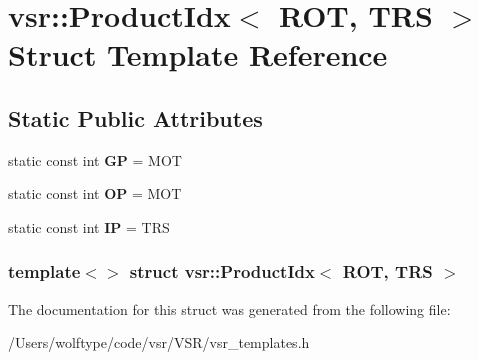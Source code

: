 \hypertarget{structvsr_1_1_product_idx_3_01_r_o_t_00_01_t_r_s_01_4}{\section{vsr\-:\-:Product\-Idx$<$ R\-O\-T, T\-R\-S $>$ Struct Template Reference}
\label{structvsr_1_1_product_idx_3_01_r_o_t_00_01_t_r_s_01_4}
}
\subsection*{Static Public Attributes}
\begin{DoxyCompactItemize}
\item 
\hypertarget{structvsr_1_1_product_idx_3_01_r_o_t_00_01_t_r_s_01_4_a405d821a42e7987003d6952e8d39e8b0}{static const int {\bfseries G\-P} = M\-O\-T}\label{structvsr_1_1_product_idx_3_01_r_o_t_00_01_t_r_s_01_4_a405d821a42e7987003d6952e8d39e8b0}

\item 
\hypertarget{structvsr_1_1_product_idx_3_01_r_o_t_00_01_t_r_s_01_4_a2451947c5d6cb7c4eff13ee0dd086631}{static const int {\bfseries O\-P} = M\-O\-T}\label{structvsr_1_1_product_idx_3_01_r_o_t_00_01_t_r_s_01_4_a2451947c5d6cb7c4eff13ee0dd086631}

\item 
\hypertarget{structvsr_1_1_product_idx_3_01_r_o_t_00_01_t_r_s_01_4_a8ba9bea420e2ff32f78f65d5c497ba6e}{static const int {\bfseries I\-P} = T\-R\-S}\label{structvsr_1_1_product_idx_3_01_r_o_t_00_01_t_r_s_01_4_a8ba9bea420e2ff32f78f65d5c497ba6e}

\end{DoxyCompactItemize}
\subsubsection*{template$<$$>$ struct vsr\-::\-Product\-Idx$<$ R\-O\-T, T\-R\-S $>$}



The documentation for this struct was generated from the following file\-:\begin{DoxyCompactItemize}
\item 
/\-Users/wolftype/code/vsr/\-V\-S\-R/vsr\-\_\-templates.\-h\end{DoxyCompactItemize}

